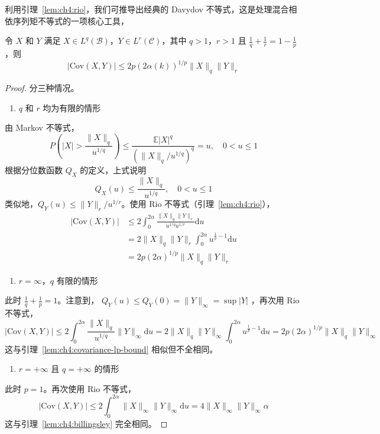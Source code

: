 利用引理~\ref{lem:ch4:rio}，我们可推导出经典的 Davydov 不等式，这是处理混合相依序列矩不等式的一项核心工具，

\begin{lemma}\label{lem:ch4:davydov}

令 $X$ 和 $Y$ 满足 $X \in L^q(\mathcal{B})$，$Y \in L^r(\mathcal{C})$，其中 $q > 1$，$r > 1$ 且 $\frac{1}{q} + \frac{1}{r} = 1 - \frac{1}{p}$，则
\[|\mathrm{Cov}(X, Y)| \leq 2p(2\alpha(k))^{1/p} \|X\|_q \|Y\|_r\]
\end{lemma}

\begin{proof}

分三种情况。

\begin{enumerate}
\def\labelenumi{\arabic{enumi}.}
\tightlist
\item
  $q$ 和 $r$ 均为有限的情形
\end{enumerate}

由 Markov 不等式，
\[P\left(|X| > \frac{\|X\|_q}{u^{1 / q}}\right) \leq \frac{\mathbb{E}|X|^q}{\left(\|X\|_q / u^{1 / q}\right)^q} = u, \quad 0 < u \leq 1\]
根据分位数函数 $Q_X$ 的定义，上式说明
\[Q_X(u) \leq \frac{\|X\|_q}{u^{1 / q}}, \quad 0 < u \leq 1\]
类似地，$Q_Y(u) \leq \|Y\|_r / u^{1 / r}$。使用 Rio 不等式（引理~\ref{lem:ch4:rio}），
\[\begin{aligned} |\mathrm {Cov}(X, Y)| & \leq 2 \int_0^{2\alpha} \frac{\|X\|_q \|Y\|_r}{u^{1 / q} u^{1 / r}} \mathrm{d}u \\ & = 2 \|X\|_q \|Y\|_r \int_0^{2\alpha} u^{\frac{1}{p} - 1} \mathrm{d}u \\ & = 2 p(2\alpha )^{1 / p} \|X\|_q \|Y\|_r \end{aligned}\]
\begin{enumerate}
\def\labelenumi{\arabic{enumi}.}
\setcounter{enumi}{1}
\tightlist
\item
  $r = \infty$，$q$ 有限的情形
\end{enumerate}

此时 $\frac{1}{q} + \frac{1}{p} = 1$。注意到， $Q_Y(u) \leq Q_Y(0) = \|Y\|_\infty = \sup |Y|$ ，再次用 Rio 不等式，
\[| \mathrm{Cov}(X, Y) | \leq 2 \int_0^{2\alpha} \frac{\|X\|_q}{u^{1/q}} \|Y\|_\infty \mathrm{d}u = 2 \|X\|_q \|Y\|_\infty \int_0^{2\alpha} u^{\frac{1}{p}-1} \mathrm{d}u = 2p(2\alpha)^{1/p} \|X\|_q \|Y\|_\infty\]
这与引理~\ref{lem:ch4:covariance-lp-bound} 相似但不全相同。

\begin{enumerate}
\def\labelenumi{\arabic{enumi}.}
\setcounter{enumi}{2}
\tightlist
\item
  $r = +\infty$ 且 $q = +\infty$ 的情形
\end{enumerate}

此时 $p = 1$。再次使用 Rio 不等式，
\[|\mathrm {Cov}(X,Y)|\leq 2\int_{0}^{2\alpha }\| X\|_{\infty}\| Y\|_{\infty}\mathrm{d}u = 4\| X\|_{\infty}\| Y\|_{\infty}\alpha\]
这与引理~\ref{lem:ch4:billingsley} 完全相同。

\end{proof}

